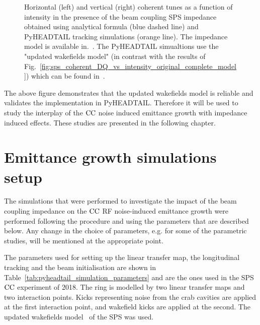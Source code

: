 \begin{figure}[!ht]
\begin{subfigure}[t]{0.45\textwidth}
    \end{subfigure}
    \hfill
     \caption{Horizontal (left) and vertical (right) coherent tunes as a function of intensity in the presence of the beam coupling SPS impedance obtained using analytical formula (blue dashed line) and PyHEADTAIL tracking simulations (orange line). The impedance model is available in.~\cite{sps_impedance_model_git}. The PyHEADTAIL simualtions use the "updated wakefields model" (in contrast with the results of Fig.~\ref{fig:sps_coherent_DQ_vs_intensity_original_complete_model}) which can be found in~\cite{updated_sps_wakfields_model}.}
     \label{fig:sps_coherent_DQ_vs_intensity_updated_model}
 \end{figure}

 The above figure demonstrates that the updated wakefields model is reliable and validates the implementation in PyHEADTAIL. Therefore it will be used to study the interplay of the ${\mathrm{CC}}$ noise induced emittance growth with impedance induced effects. These studies are presented in the following chapter.


\section{Emittance growth simulations setup}\label{sec:setup_simulations_emit_growth}
The simulations that were performed to investigate the impact of the beam coupling impedance on the ${\mathrm{CC}}$ RF noise-induced emittance growth were performed following the procedure and using the parameters that are described below. Any change in the choice of parameters, e.g. for some of the parametric studies, will be mentioned at the appropriate point.

The parameters used for setting up the linear transfer map, the longitudinal tracking and the beam initialisation are shown in Table~\ref{tab:pyheadtail_simulation_parameters} and are the ones used in the SPS ${\mathrm{CC}}$ experiment of 2018. The ring is modelled by two linear transfer maps and two interaction points. Kicks representing noise from the crab cavities are applied at the first interaction point, and wakefield kicks are applied at the second. The updated wakefields model~\cite{updated_sps_wakfields_model} of the SPS was used.

